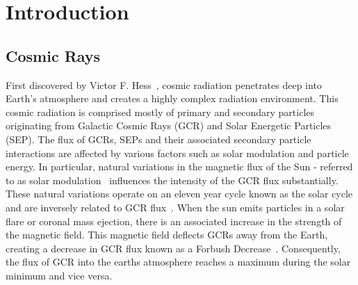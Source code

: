 \section{Introduction}
\label{Introduction}
\subsection{Cosmic Rays}
First discovered by Victor F. Hess~\cite{hess}, cosmic radiation penetrates deep into Earth's atmosphere and creates a highly complex radiation environment.  This cosmic radiation is comprised mostly of primary and secondary particles originating from Galactic Cosmic Rays (GCR) and Solar Energetic Particles (SEP). The flux of GCRs, SEPs and their associated secondary particle interactions are affected by various factors such as solar modulation and particle energy.
In particular, natural variations in the magnetic flux of the Sun - referred to as solar modulation~\cite{abe} influences the intensity of the GCR flux substantially. These natural variations operate on an eleven year cycle known as the solar cycle and are inversely related to GCR flux~\cite{hathaway}. When the sun emits particles in a solar flare or coronal mass ejection, there is an associated increase in the strength of the magnetic field. This magnetic field deflects GCRs away from the Earth, creating a decrease in GCR flux known as a Forbush Decrease~\cite{forbush-decrease}. Consequently, the flux of GCR into the earths atmosphere reaches a maximum during the solar minimum and vice versa.

